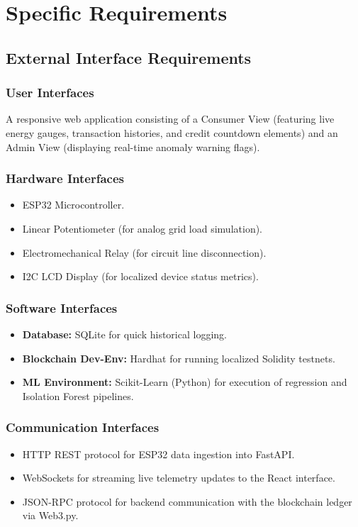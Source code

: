 
\section{Specific Requirements}

\subsection{External Interface Requirements}
\subsubsection{User Interfaces}
A responsive web application consisting of a Consumer View (featuring live energy gauges, transaction histories, and credit countdown elements) and an Admin View (displaying real-time anomaly warning flags).

\subsubsection{Hardware Interfaces}
\begin{itemize}[leftmargin=*]
    \item ESP32 Microcontroller.
    \item Linear Potentiometer (for analog grid load simulation).
    \item Electromechanical Relay (for circuit line disconnection).  
    \item I2C LCD Display (for localized device status metrics). 
\end{itemize}

\subsubsection{Software Interfaces}
\begin{itemize}[leftmargin=*]
    \item \textbf{Database:} SQLite for quick historical logging.
    \item \textbf{Blockchain Dev-Env:} Hardhat for running localized Solidity testnets.
    \item \textbf{ML Environment:} Scikit-Learn (Python) for execution of regression and Isolation Forest pipelines.
\end{itemize}

\subsubsection{Communication Interfaces}
\begin{itemize}[leftmargin=*]
    \item HTTP REST protocol for ESP32 data ingestion into FastAPI.  
    \item WebSockets for streaming live telemetry updates to the React interface.
    \item JSON-RPC protocol for backend communication with the blockchain ledger via Web3.py. 
\end{itemize}


